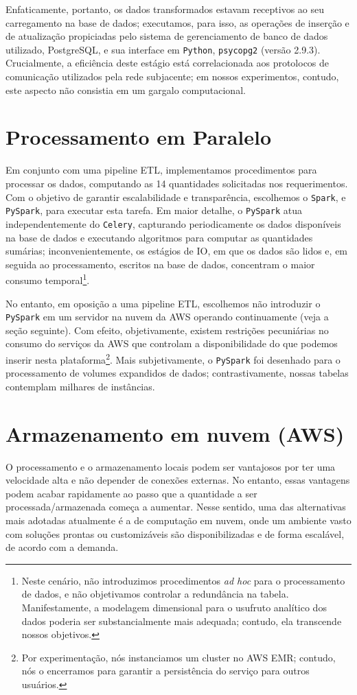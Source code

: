 \documentclass[12pt,oneside,a4paper]{article}
\begin{document}
Enfaticamente, portanto, os dados transformados estavam receptivos ao seu carregamento na base de dados; executamos, para isso, as operações de inserção e de atualização propiciadas pelo sistema de gerenciamento de banco de dados utilizado, PostgreSQL, e sua interface em \texttt{Python}, \texttt{psycopg2} (versão 2.9.3). Crucialmente, a eficiência deste estágio está correlacionada aos protolocos de comunicação utilizados pela rede subjacente; em nossos experimentos, contudo, este aspecto não consistia em um gargalo computacional. 

\section{Processamento em Paralelo} 

Em conjunto com uma pipeline ETL, implementamos procedimentos para processar os dados, computando as 14 quantidades solicitadas nos requerimentos. Com o objetivo de garantir escalabilidade e transparência, escolhemos o \texttt{Spark}, e \texttt{PySpark}, para executar esta tarefa. Em maior detalhe, o \texttt{PySpark} atua independentemente do \texttt{Celery}, capturando periodicamente os dados disponíveis na base de dados e executando algoritmos para computar as quantidades sumárias; inconvenientemente, os estágios de IO, em que os dados são lidos e, em seguida ao processamento, escritos na base de dados, concentram o maior consumo temporal\footnote{Neste cenário, não introduzimos procedimentos \textit{ad hoc} para o processamento de dados, e não objetivamos controlar a redundância na tabela. Manifestamente, a modelagem dimensional para o usufruto analítico dos dados poderia ser substancialmente mais adequada; contudo, ela transcende nossos objetivos.}. 

No entanto, em oposição a uma pipeline ETL, escolhemos não introduzir o \texttt{PySpark} em um servidor na nuvem da AWS operando continuamente (veja a seção seguinte). Com efeito, objetivamente, existem restrições pecuniárias no consumo do serviços da AWS que controlam a disponibilidade do que podemos inserir nesta plataforma\footnote{Por experimentação, nós instanciamos um cluster no AWS EMR; contudo, nós o encerramos para garantir a persistência do serviço para outros usuários.}. Mais subjetivamente, o \texttt{PySpark} foi desenhado para o processamento de volumes expandidos de dados; contrastivamente, nossas tabelas contemplam milhares de instâncias.   

\section{Armazenamento em nuvem (AWS)}
    O processamento e o armazenamento locais podem ser vantajosos por ter uma velocidade alta e não depender de conexões externas. No entanto, essas vantagens podem acabar rapidamente ao passo que a quantidade a ser processada/armazenada começa a aumentar. Nesse sentido, uma das alternativas mais adotadas atualmente é a de computação em nuvem, onde um ambiente vasto com soluções prontas ou customizáveis são disponibilizadas e de forma escalável, de acordo com a demanda.
    
\end{document}
